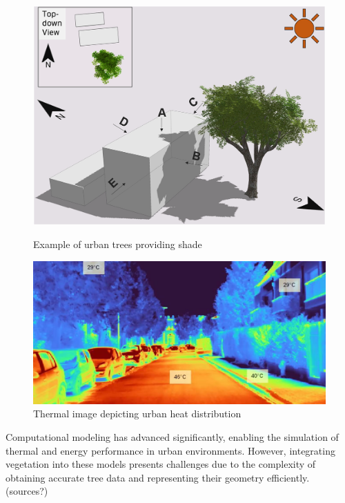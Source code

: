 \documentclass[12pt]{article}
\begin{document}
\begin{figure}[H]
    \centering
    \begin{minipage}{0.45\textwidth}
        \centering
        \includegraphics[width=\textwidth]{images/TreeShade.png}
        \caption{Example of urban trees providing shade \cite{img:TreeShade}}
    \end{minipage}\hfill
    \begin{minipage}{0.45\textwidth}
        \centering
        \includegraphics[width=\textwidth]{images/heat_street.png}
        \caption{Thermal image depicting urban heat distribution \cite{img:street_thermography}}
    \end{minipage}
\end{figure}

Computational modeling has advanced significantly, enabling the simulation of thermal 
and energy performance in urban environments. However, integrating vegetation into 
these models presents challenges due to the complexity of obtaining accurate tree data 
and representing their geometry efficiently. (sources?)
\end{document}
